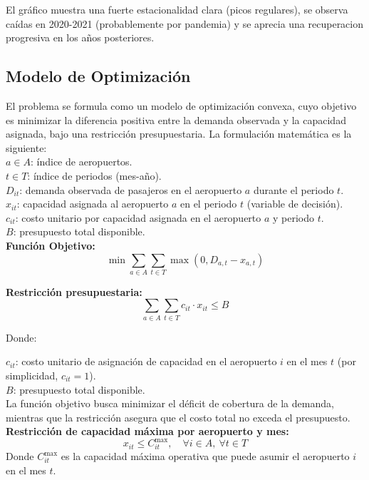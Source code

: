 \documentclass[11pt, a4paper, twocolumn]{article}
\begin{document}
El gráfico muestra una fuerte estacionalidad clara (picos regulares), se observa caídas en 2020-2021 (probablemente por pandemia) y se aprecia una recuperacion progresiva en los años posteriores.

\subsection{Modelo de Optimización}

El problema se formula como un modelo de optimización convexa, cuyo objetivo es minimizar la diferencia positiva entre la demanda observada y la capacidad asignada, bajo una restricción presupuestaria. La formulación matemática es la siguiente: \\

$a \in A$: índice de aeropuertos.\\

$t \in T$: índice de periodos (mes-año).\\

$D_{it}$: demanda observada de pasajeros en el aeropuerto $a$ durante el periodo $t$.\\

$x_{it}$: capacidad asignada al aeropuerto $a$ en el periodo $t$ (variable de decisión).\\

$c_{it}$: costo unitario por capacidad asignada en el aeropuerto $a$ y periodo $t$.\\

$B$: presupuesto total disponible.\\

\textbf{Función Objetivo:}
\[
\min \sum_{a \in A} \sum_{t \in T} \max(0, D_{a,t} - x_{a,t})
\]

\textbf{Restricción presupuestaria:}
\[
\sum_{a \in A} \sum_{t \in T} c_{it} \cdot x_{it} \leq B
\]

Donde:

    $c_{it}$: costo unitario de asignación de capacidad en el aeropuerto $i$ en el mes $t$ (por simplicidad, $c_{it} = 1$).\\
    
    $B$: presupuesto total disponible.\\

    
La función objetivo busca minimizar el déficit de cobertura de la demanda, mientras que la restricción asegura que el costo total no exceda el presupuesto.\\


\textbf{Restricción de capacidad máxima por aeropuerto y mes:}
    \[
    x_{it} \leq C^{\text{max}}_{it}, \quad \forall i \in A,\ \forall t \in T
    \]
    Donde $C^{\text{max}}_{it}$ es la capacidad máxima operativa que puede asumir el aeropuerto $i$ en el mes $t$.
\end{document}

